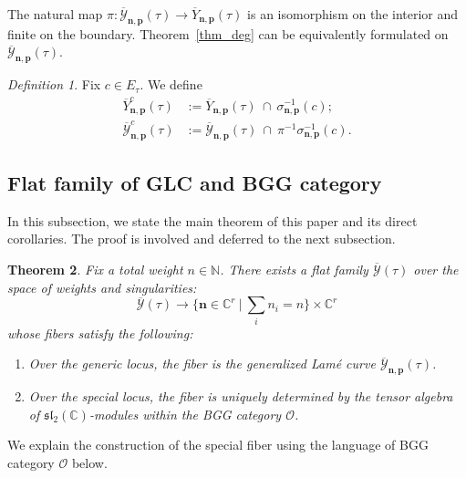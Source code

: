 \documentclass[11pt]{amsart}
\newtheorem{theorem}{Theorem}[section]
\theoremstyle{remark}
\newtheorem{definition}[theorem]{Definition}
\numberwithin{equation}{section}
\begin{document}
The natural map $\pi : \overline{\mathcal{Y}}_{\mathbf{n},\mathbf{p}}(\tau) \rightarrow \overline{Y}_{\mathbf{n},\mathbf{p}}(\tau)  $ is an isomorphism on the interior and finite on the boundary. Theorem~\ref{thm_deg} can be equivalently formulated on $\overline{\mathcal{Y}}_{\mathbf{n},\mathbf{p}}(\tau)$. 

\begin{definition} Fix $c \in E_\tau$. We define 
\[
\begin{split}
    \overline{Y}_{\mathbf{n},\mathbf{p}}^c(\tau) &:= \overline{Y}_{\mathbf{n},\mathbf{p}}(\tau) \ \cap \ \sigma^{-1}_{\mathbf{n},\mathbf{p}}( c );
    \\
    \overline{\mathcal{Y}}_{\mathbf{n},\mathbf{p}}^c(\tau) &:= \overline{\mathcal{Y}}_{\mathbf{n},\mathbf{p}}(\tau) \ \cap \ \pi^{-1}\sigma^{-1}_{\mathbf{n},\mathbf{p}}( c ).
\end{split}
\]
\end{definition}

\subsection{Flat family of GLC and BGG category}
In this subsection, we state the main theorem of this paper and its direct corollaries. The proof is involved and deferred to the next subsection.

\begin{theorem} \label{thm:universal_flatness}
Fix a total weight $n \in \mathbb{N}$. There exists a flat family $\overline{\mathcal{Y}}(\tau)$ over the space of weights and singularities:
\[
    \overline{\mathcal{Y}}(\tau) \rightarrow \Big\{ \mathbf{n} \in \mathbb{C}^r \ \Big| \ \sum_i n_i = n \Big\} \times \mathbb{C}^r
\]
whose fibers satisfy the following:
\begin{enumerate}
    \item Over the generic locus, the fiber is the generalized Lam\'e curve $\overline{\mathcal{Y}}_{\mathbf{n},\mathbf{p}}(\tau)$.
    \item Over the special locus, the fiber is uniquely determined by the tensor algebra of $\mathfrak{sl}_2(\mathbb{C})$-modules within the BGG category $\mathcal{O}$.
\end{enumerate}
\end{theorem}

We explain the construction of the special fiber using the language of BGG category $\mathcal{O}$ below.
\end{document}
